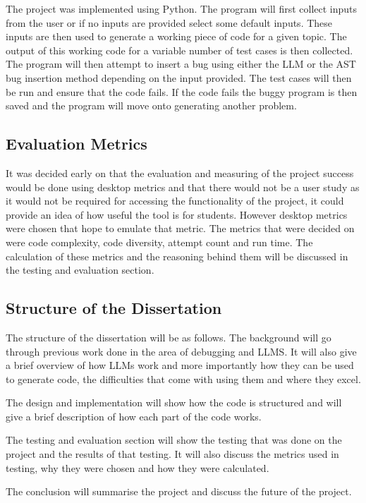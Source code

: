 \documentclass[12pt]{extarticle}
\begin{document}
The project was implemented using Python. The program will first collect inputs from the user or if no inputs are provided select some default inputs. These inputs are then used to generate a working piece of code for a given topic. The output of this working code for a variable number of test cases is then collected. The program will then attempt to insert a bug using either the LLM or the AST bug insertion method depending on the input provided. The test cases will then be run and ensure that the code fails. If the code fails the buggy program is then saved and the program will move onto generating another problem. 

\subsection{Evaluation Metrics}

It was decided early on that the evaluation and measuring of the project success would be done using desktop metrics and that there would not be a user study as it would not be required for accessing the functionality of the project, it could provide an idea of how useful the tool is for students. However desktop metrics were chosen that hope to emulate that metric. The metrics that were decided on were code complexity, code diversity, attempt count and run time. The calculation of these metrics and the reasoning behind them will be discussed in the testing and evaluation section.

\subsection{Structure of the Dissertation}

The structure of the dissertation will be as follows. The background will go through previous work done in the area of debugging and LLMS. It will also give a brief overview of how LLMs work and more importantly how they can be used to generate code, the difficulties that come with using them and where they excel. 

The design and implementation will show how the code is structured and will give a brief description of how each part of the code works.

The testing and evaluation section will show the testing that was done on the project and the results of that testing. It will also discuss the metrics used in testing, why they were chosen and how they were calculated.

The conclusion will summarise the project and discuss the future of the project.
\newpage
\end{document}
